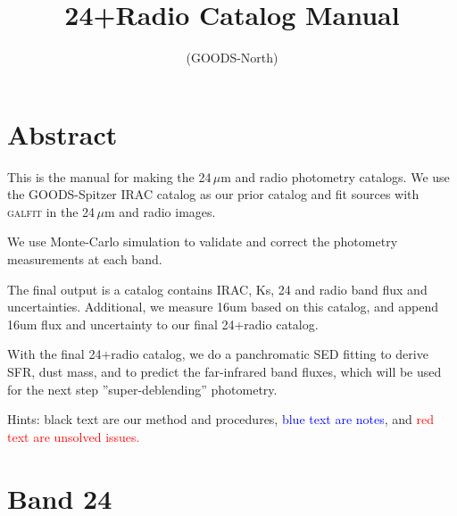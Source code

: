 \documentclass[11pt,a4paper]{article}
\author{}
\title{24+Radio Catalog Manual}
\subtitle{(GOODS-North)}
\begin{document}
\maketitle
\tableofcontents
\clearpage
\setlength{\baselineskip}{16pt}
\setlength{\parskip}{5pt}

\section{Abstract}

This is the manual for making the 24\,$\mu$m and radio photometry catalogs. We use the GOODS-Spitzer IRAC catalog as our prior catalog and fit sources with \textsc{galfit} in the 24\,$\mu$m and radio images. 

We use Monte-Carlo simulation to validate and correct the photometry measurements at each band. 

The final output is a catalog contains IRAC, Ks, 24 and radio band flux and uncertainties. Additional, we measure 16um based on this catalog, and append 16um flux and uncertainty to our final 24+radio catalog. 

With the final 24+radio catalog, we do a panchromatic SED fitting to derive SFR, dust mass, and to predict the far-infrared band fluxes, which will be used for the next step ''super-deblending'' photometry. 

\vspace{5cm}
Hints: black text are our method and procedures, \textcolor{blue}{blue text are notes}, and \textcolor{red}{red text are unsolved issues.}


\clearpage

\section{Band 24}
\end{document}
